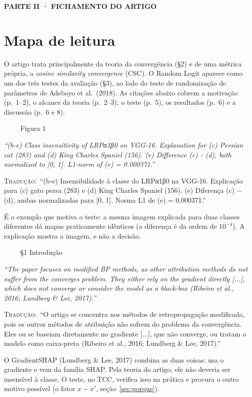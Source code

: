 \documentclass[11pt,a4paper]{article}
\newcommand{\pagechip}[1]{{\setlength{\fboxsep}{1.5pt}\colorbox{cAcc}{\textcolor{white}{\scriptsize\texttt{#1}}}}}
\newcommand{\partbar}[1]{\par\vspace{1.2em}\noindent\colorbox{black!80}{\parbox{\dimexpr\linewidth-2\fboxsep}{\color{white}\bfseries\sffamily\MakeUppercase{#1}}}\par\vspace{0.4em}}
\newenvironment{origquote}{\par\itshape\small}{\par}
\newenvironment{tradquote}{\par\small\textsc{Tradução:}\ }{\par}
\newcommand{\explab}[1]{\par\smallskip{\small\color{cAcc}\textbf{\MakeUppercase{#1}}}\par}
\begin{document}
\partbar{Parte II · Fichamento do artigo}

\section{Mapa de leitura}
O artigo trata principalmente da teoria da convergência (§2) e de uma métrica própria, a \textit{cosine similarity convergence} (CSC). O Random Logit aparece como um dos três testes da avaliação (§3), ao lado do teste de randomização de parâmetros de Adebayo et al.\ (2018). As citações abaixo cobrem a motivação (p.~1--2), o alcance da teoria (p.~2--3), o teste (p.~5), os resultados (p.~6) e a discussão (p.~6 e 8).

\begin{citacard}{\pagechip{p. 1} Figura 1}
\begin{origquote}“(b-e) Class insensitivity of LRPα1β0 on VGG-16. Explanation for (c) Persian cat (283) and (d) King Charles Spaniel (156). (e) Difference (c) - (d), both normalized to [0, 1]. L1-norm of (e) = 0.000371.”\end{origquote}
\begin{tradquote}“(b-e) Insensibilidade à classe do LRPα1β0 na VGG-16. Explicação para (c) gato persa (283) e (d) King Charles Spaniel (156). (e) Diferença (c) $-$ (d), ambas normalizadas para [0, 1]. Norma L1 de (e) = 0,000371.”\end{tradquote}
\explab{Explicação}
É o exemplo que motiva o teste: a mesma imagem explicada para duas classes diferentes dá mapas praticamente idênticos (a diferença é da ordem de $10^{-4}$). A explicação mostra a imagem, e não a decisão.
\end{citacard}

\begin{citacard}{\pagechip{p. 2} §1 Introdução}
\begin{origquote}“The paper focuses on modified BP methods, as other attribution methods do not suffer from the converges problem. They either rely on the gradient directly [...], which does not converge or consider the model as a black-box (Ribeiro et al., 2016; Lundberg \& Lee, 2017).”\end{origquote}
\begin{tradquote}“O artigo se concentra nos métodos de retropropagação modificada, pois os outros métodos de atribuição não sofrem do problema da convergência. Eles ou se baseiam diretamente no gradiente [...], que não converge, ou tratam o modelo como caixa-preta (Ribeiro et al., 2016; Lundberg \& Lee, 2017).”\end{tradquote}
\explab{Explicação}
O GradientSHAP (Lundberg \& Lee, 2017) combina as duas coisas: usa o gradiente e vem da família SHAP. Pela teoria do artigo, ele não deveria ser insensível à classe. O teste, no TCC, verifica isso na prática e procura o outro motivo possível (o fator $x - x'$, seção~\ref{sec:porque}).
\end{citacard}
\end{document}
